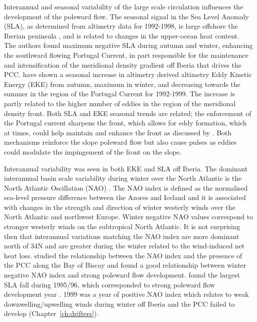 Interannual and seasonal variability of the large scale
circulation influences the development of the poleward flow. The
seasonal signal in the Sea Level Anomaly (SLA), as determined from
altimetry data for 1992-1998, is large offshore the Iberian
peninsula \citep{Efthymiadis02}, and is related to changes in the
upper-ocean heat content. The authors found maximum negative SLA
during autumn and winter, enhancing the southward flowing Portugal
Current, in part responsible for the maintenance and
intensification of the meridional density gradient off Iberia that
drives the PCC. \citet{Martins02} have shown a seasonal increase
in altimetry derived altimetry Eddy Kinetic Energy (EKE) from
autumn, maximum in winter, and decreasing towards the summer in
the region of the Portugal Current for 1992-1999. The increase is
partly related to the higher number of eddies in the region of the
meridional density front. Both SLA and EKE seasonal trends are
related; the enforcement of the Portugal current sharpens the
front, which allows for eddy formation, which at times, could help
maintain and enhance the front as discussed by \citet{Dubert98}.
Both mechanisms reinforce the slope poleward flow but also cause
pulses as eddies could modulate the impingement of the front on
the slope.

Interannual variability was seen in both EKE\citep{Martins02} and
SLA \citep{Efthymiadis02} off Iberia. The dominant interannual
basin scale variability during winter over the North Atlantic is
the North Atlantic Oscillation (NAO) \citep{Rogers85}. The NAO
index is defined as the normalised sea-level pressure difference
between the Azores and Iceland \citep{Jones97} and it is
associated with changes in the strength and direction of winter
westerly winds over the North Atlantic and northwest Europe.
Winter negative NAO values correspond to stronger westerly winds
on the subtropical North Atlantic. It is not surprising then that
interannual variations matching the NAO index are more dominant
north of 34\deg N \citep{Efthymiadis02} and are greater during the
winter related to the wind-induced net heat loss. \citet{Garcia02}
studied the relationship between the NAO index and the presence of
the PCC along the Bay of Biscay and found a good relationship
between winter negative NAO index and strong poleward flow
development. \citet{Efthymiadis02} found the largest SLA fall
during 1995/96, which corresponded to strong poleward flow
development year \citep{Garcia02,Pingree99}. 1999 was a year of
positive NAO index which relates to weak downwelling/upwelling
winds during winter off Iberia and the PCC failed to develop
(Chapter~\ref{ch:drifters}).

